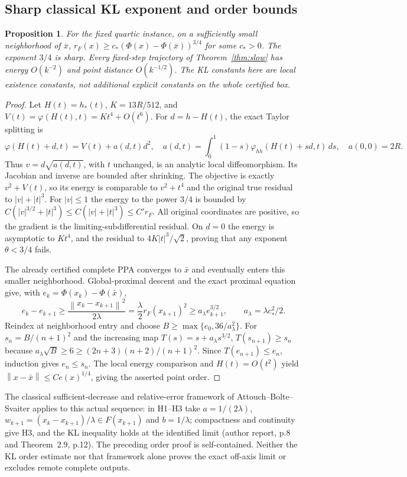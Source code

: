 \documentclass[11pt]{article}
\newcommand{\norm}[1]{\left\lVert#1\right\rVert}
\newtheorem{proposition}[theorem]{Proposition}
\theoremstyle{remark}\newtheorem{remark}[theorem]{Remark}
\begin{document}
\subsection{Sharp classical KL exponent and order bounds}
\begin{proposition}\label{prop:kl}
For the fixed quartic instance, on a sufficiently small neighborhood
of $\bar x$, $r_F(x)\ge c_*(\Phi(x)-\Phi(\bar x))^{3/4}$
for some $c_*>0$. The exponent $3/4$ is sharp.
Every fixed-step trajectory of Theorem~\ref{thm:slow}
has energy $O(k^{-2})$ and point distance $O(k^{-1/2})$.
The KL constants here are local existence constants, not additional
explicit constants on the whole certified box.
\end{proposition}
\begin{proof}
Let $H(t)=h_*(t)$, $K=13R/512$, and
$V(t)=\varphi(H(t),t)=Kt^4+O(t^6)$.
For $d=h-H(t)$, the exact Taylor splitting is
\[
 \varphi(H(t)+d,t)=V(t)+a(d,t)d^2,\quad
 a(d,t)=\int_0^1(1-s)\varphi_{hh}(H(t)+sd,t)\,ds,\quad a(0,0)=2R.
\]
Thus $v=d\sqrt{a(d,t)}$, with $t$ unchanged, is an analytic local
diffeomorphism. Its Jacobian and inverse are bounded after shrinking.
The objective is exactly $v^2+V(t)$, so its energy is comparable to
$v^2+t^4$ and the original true residual to $|v|+|t|^3$.
For $|v|\le1$ the energy to the power $3/4$ is bounded by
$C(|v|^{3/2}+|t|^3)\le C(|v|+|t|^3)\le C'r_F$.
All original coordinates are positive, so the gradient is the
limiting-subdifferential residual. On $d=0$ the energy is asymptotic
to $Kt^4$, and the residual to $4K|t|^3/\sqrt2$, proving that any
exponent $\theta<3/4$ fails.

The already certified complete PPA converges to $\bar x$ and
eventually enters this smaller neighborhood. Global-proximal descent
and the exact proximal equation give, with $e_k=\Phi(x_k)-\Phi(\bar x)$,
\[
 e_k-e_{k+1}\ge\frac{\norm{x_k-x_{k+1}}^2}{2\lambda}
 =\frac\lambda2 r_F(x_{k+1})^2
 \ge a_\lambda e_{k+1}^{3/2},\qquad a_\lambda=\lambda c_*^2/2.
\]
Reindex at neighborhood entry and choose
$B\ge\max\{e_0,36/a_\lambda^2\}$.
For $s_n=B/(n+1)^2$ and the increasing map
$T(s)=s+a_\lambda s^{3/2}$,
$T(s_{n+1})\ge s_n$ because
$a_\lambda\sqrt B\ge6\ge(2n+3)(n+2)/(n+1)^2$.
Since $T(e_{n+1})\le e_n$, induction gives $e_n\le s_n$.
The local energy comparison and $H(t)=O(t^2)$ yield
$\norm{x-\bar x}\le C e(x)^{1/4}$, giving the asserted point order.
\end{proof}

The classical sufficient-decrease and relative-error framework
of Attouch--Bolte--Svaiter\cite{ABS} applies to this actual sequence:
in H1--H3 take $a=1/(2\lambda)$,
$w_{k+1}=(x_k-x_{k+1})/\lambda\in F(x_{k+1})$ and $b=1/\lambda$;
compactness and continuity give H3, and the KL inequality holds at
the identified limit (author report, p.8 and Theorem~2.9, p.12).
The preceding order proof is self-contained.
Neither the KL order estimate nor that framework alone proves the exact
off-axis limit or excludes remote complete outputs.
\end{document}
